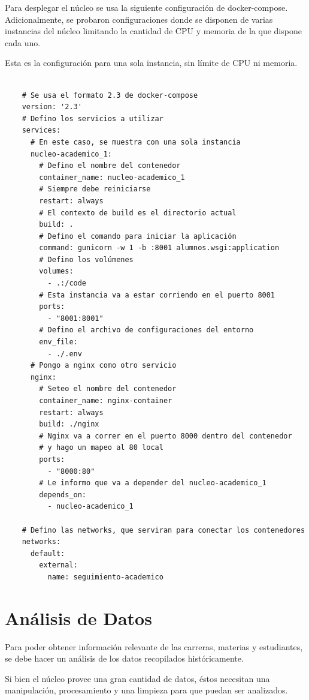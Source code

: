 Para desplegar el núcleo se usa la siguiente configuración de docker-compose. Adicionalmente, se probaron configuraciones donde se disponen de varias instancias del núcleo limitando la cantidad de CPU y memoria de la que dispone cada uno. 

Esta es la configuración para una sola instancia, sin límite de CPU ni memoria.


\begin{verbatim}
    
    # Se usa el formato 2.3 de docker-compose
    version: '2.3'
    # Defino los servicios a utilizar
    services:
      # En este caso, se muestra con una sola instancia
      nucleo-academico_1:
        # Defino el nombre del contenedor
        container_name: nucleo-academico_1
        # Siempre debe reiniciarse
        restart: always
        # El contexto de build es el directorio actual
        build: .
        # Defino el comando para iniciar la aplicación
        command: gunicorn -w 1 -b :8001 alumnos.wsgi:application
        # Defino los volúmenes
        volumes:
          - .:/code
        # Esta instancia va a estar corriendo en el puerto 8001
        ports:
          - "8001:8001"
        # Defino el archivo de configuraciones del entorno
        env_file:
          - ./.env
      # Pongo a nginx como otro servicio
      nginx:
        # Seteo el nombre del contenedor
        container_name: nginx-container
        restart: always
        build: ./nginx
        # Nginx va a correr en el puerto 8000 dentro del contenedor 
        # y hago un mapeo al 80 local
        ports:
          - "8000:80"
        # Le informo que va a depender del nucleo-academico_1
        depends_on:
          - nucleo-academico_1
    
    # Defino las networks, que serviran para conectar los contenedores
    networks:
      default:
        external:
          name: seguimiento-academico
  \end{verbatim}

\section[Análisis de Datos]{Análisis de Datos}

Para poder obtener información relevante de las carreras, materias y estudiantes, se debe hacer un análisis de los datos recopilados históricamente.

Si bien el núcleo provee una gran cantidad de datos, éstos necesitan una manipulación, procesamiento y una limpieza para que puedan ser analizados.

